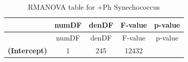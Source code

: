 \documentclass[]{article}
\begin{document}
\begin{longtable}[]{@{}ccccc@{}}
\caption{RMANOVA table for +Ph Synechococcus}\tabularnewline
\toprule
\begin{minipage}[b]{0.21\columnwidth}\centering\strut
~\strut
\end{minipage} & \begin{minipage}[b]{0.10\columnwidth}\centering\strut
numDF\strut
\end{minipage} & \begin{minipage}[b]{0.10\columnwidth}\centering\strut
denDF\strut
\end{minipage} & \begin{minipage}[b]{0.12\columnwidth}\centering\strut
F-value\strut
\end{minipage} & \begin{minipage}[b]{0.12\columnwidth}\centering\strut
p-value\strut
\end{minipage}\tabularnewline
\midrule
\endfirsthead
\toprule
\begin{minipage}[b]{0.21\columnwidth}\centering\strut
~\strut
\end{minipage} & \begin{minipage}[b]{0.10\columnwidth}\centering\strut
numDF\strut
\end{minipage} & \begin{minipage}[b]{0.10\columnwidth}\centering\strut
denDF\strut
\end{minipage} & \begin{minipage}[b]{0.12\columnwidth}\centering\strut
F-value\strut
\end{minipage} & \begin{minipage}[b]{0.12\columnwidth}\centering\strut
p-value\strut
\end{minipage}\tabularnewline
\midrule
\endhead
\begin{minipage}[t]{0.21\columnwidth}\centering\strut
\textbf{(Intercept)}\strut
\end{minipage} & \begin{minipage}[t]{0.10\columnwidth}\centering\strut
1\strut
\end{minipage} & \begin{minipage}[t]{0.10\columnwidth}\centering\strut
245\strut
\end{minipage} & \begin{minipage}[t]{0.12\columnwidth}\centering\strut
12432\strut
\end{minipage} & \begin{minipage}[t]{0.12\columnwidth}\centering\strut

\end{minipage}
\end{longtable}
\end{document}
